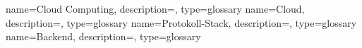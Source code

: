 {
    name=Cloud Computing,
    description={},
    type=glossary
}
{
    name=Cloud,
    description={},
    type=glossary
}
{
    name=Protokoll-Stack,
    description={},
    type=glossary
}
{
    name=Backend,
    description={},
    type=glossary
}